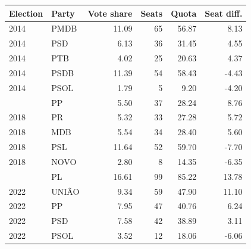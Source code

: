 \begin{tabular}{llrrrr}
\toprule
Election & Party & Vote share & Seats & Quota & Seat diff. \\
\midrule
2014 & PMDB & 11.09 & 65 & 56.87 & 8.13 \\
2014 & PSD & 6.13 & 36 & 31.45 & 4.55 \\
2014 & PTB & 4.02 & 25 & 20.63 & 4.37 \\
2014 & PSDB & 11.39 & 54 & 58.43 & -4.43 \\
2014 & PSOL & 1.79 & 5 & 9.20 & -4.20 \\
\addlinespace
2018 & PP & 5.50 & 37 & 28.24 & 8.76 \\
2018 & PR & 5.32 & 33 & 27.28 & 5.72 \\
2018 & MDB & 5.54 & 34 & 28.40 & 5.60 \\
2018 & PSL & 11.64 & 52 & 59.70 & -7.70 \\
2018 & NOVO & 2.80 & 8 & 14.35 & -6.35 \\
\addlinespace
2022 & PL & 16.61 & 99 & 85.22 & 13.78 \\
2022 & UNIÃO & 9.34 & 59 & 47.90 & 11.10 \\
2022 & PP & 7.95 & 47 & 40.76 & 6.24 \\
2022 & PSD & 7.58 & 42 & 38.89 & 3.11 \\
2022 & PSOL & 3.52 & 12 & 18.06 & -6.06 \\
\bottomrule
\end{tabular}
